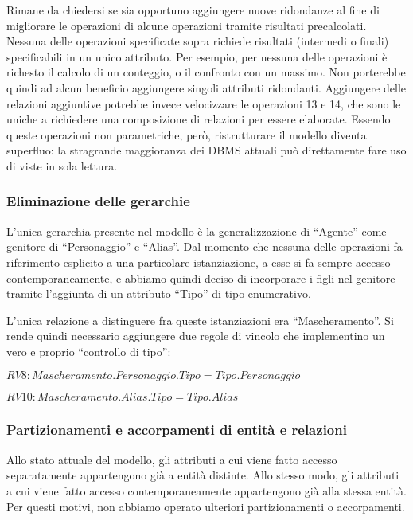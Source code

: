 \documentclass{article}
\begin{document}
Rimane da chiedersi se sia opportuno aggiungere nuove ridondanze al fine di
migliorare le operazioni di alcune operazioni tramite risultati precalcolati.
Nessuna delle operazioni specificate sopra richiede risultati (intermedi o
finali) specificabili in un unico attributo. Per esempio, per nessuna delle
operazioni è richesto il calcolo di un conteggio, o il confronto con un massimo.
Non porterebbe quindi ad alcun beneficio aggiungere singoli attributi
ridondanti. Aggiungere delle relazioni aggiuntive potrebbe invece velocizzare
le operazioni 13 e 14, che sono le uniche a richiedere una composizione di
relazioni per essere elaborate. Essendo queste operazioni non parametriche,
però, ristrutturare il modello diventa superfluo: la stragrande maggioranza dei
DBMS attuali può direttamente fare uso di viste in sola lettura.

\subsubsection{Eliminazione delle gerarchie}

L'unica gerarchia presente nel modello è la generalizzazione di ``Agente'' come
genitore di ``Personaggio'' e ``Alias''. Dal momento che nessuna delle operazioni fa
riferimento esplicito a una particolare istanziazione, a esse si fa sempre
accesso contemporaneamente, e abbiamo quindi deciso di incorporare i figli nel
genitore tramite l'aggiunta di un attributo ``Tipo'' di tipo enumerativo.


L'unica
relazione a distinguere fra queste istanziazioni era ``Mascheramento''. Si rende
quindi necessario aggiungere due regole di vincolo che implementino un vero e
proprio ``controllo di tipo'':

\begin{math}
	RV8: Mascheramento.Personaggio.Tipo = Tipo.Personaggio
\end{math}

\begin{math}
	RV10: Mascheramento.Alias.Tipo = Tipo.Alias
\end{math}

\subsubsection{Partizionamenti e accorpamenti di entità e relazioni}

Allo stato attuale del modello, gli attributi a cui viene fatto accesso
separatamente appartengono già a entità distinte. Allo stesso modo, gli
attributi a cui viene fatto accesso contemporaneamente appartengono già alla
stessa entità. Per questi motivi, non abbiamo operato ulteriori partizionamenti
o accorpamenti.
\end{document}
